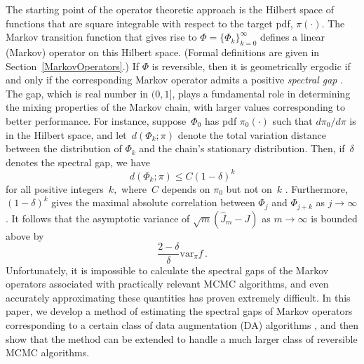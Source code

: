\documentclass[11pt]{article}
\begin{document}
        The starting point of the operator theoretic approach is the
        Hilbert space of functions that are square integrable with
        respect to the target pdf, $\pi(\cdot)$.  The Markov
        transition function that gives rise to $\Phi =
        \{\Phi_k\}_{k=0}^{\infty}$ defines a linear (Markov) operator
        on this Hilbert space.  (Formal definitions are given in
        Section~\ref{MarkovOperators}.)  If $\Phi$ is reversible, then
        it is geometrically ergodic if and only if the corresponding
        Markov operator admits a positive \textit{spectral gap}
        \citep{roberts1997geometric,kontoyiannis2012geometric}.  The
        gap, which is real number in $(0,1]$, plays a fundamental role
        in determining the mixing properties of the Markov chain, with
        larger values corresponding to better performance.  For
        instance, suppose~$\Phi_0$ has pdf $\pi_0(\cdot)$ such that
        $d\pi_0/d\pi$ is in the Hilbert space, and let~$d(\Phi_k;
        \pi)$ denote the total variation distance between the
        distribution of $\Phi_k$ and the chain's stationary
        distribution.  Then, if~$\delta$ denotes the spectral gap, we
        have
	\[
	d(\Phi_k;\pi) \leq C(1-\delta)^k
	\]
	for all positive integers~$k,$ where~$C$ depends on $\pi_0$
        but not on~$k$ \citep{roberts1997geometric}.  Furthermore,
        $(1-\delta)^k$ gives the maximal absolute correlation between
        $\Phi_j$ and $\Phi_{j+k}$ as $j \to \infty$.  It follows
        \citep[see e.g.][]{mira1999ordering} that the asymptotic
        variance of $\sqrt{m}(\hat{J}_m - J)$ as $m \to \infty$ is
        bounded above by
	\[
	\frac{2-\delta}{\delta} \mathrm{var}_{\pi}f \,.
	\]
	Unfortunately, it is impossible to calculate the spectral gaps
        of the Markov operators associated with practically relevant
        MCMC algorithms, and even accurately approximating these
        quantities has proven extremely difficult.  In this paper, we
        develop a method of estimating the spectral gaps of Markov
        operators corresponding to a certain class of data
        augmentation (DA) algorithms \citep{tanner1987calculation},
        and then show that the method can be extended to handle a much
        larger class of reversible MCMC algorithms.
\end{document}
